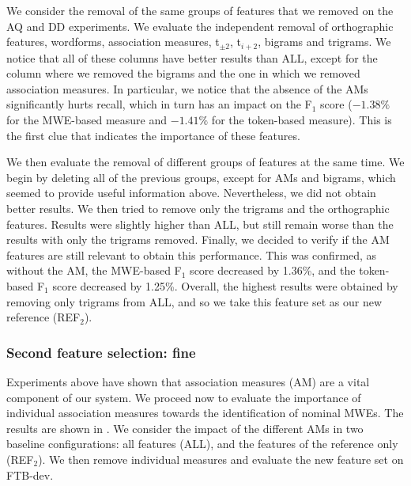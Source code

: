 \documentclass[output=paper,
modfonts
]{langscibook}
\begin{document}
We consider the removal of the same groups of features that we removed on the AQ and DD experiments. We evaluate the independent removal of orthographic features, wordforms, association measures, t$_{\pm 2}$, t$_{i+2}$, bigrams and trigrams. We notice that all of these columns have better results than ALL, except for the column where we removed the bigrams and the one in which we removed association measures. In particular, we notice that the absence of the AMs significantly hurts recall, which in turn has an impact on the F$_1$ score ($-1.38\%$ for the MWE-based measure and $-1.41\%$ for the token-based measure). This is the first clue that indicates the importance of these features. 

We then evaluate the removal of different groups of features at the same time. We begin by deleting all of the previous groups, except for AMs and bigrams, which seemed to provide useful information above. Nevertheless, we did not obtain better results.
We then tried to remove only the trigrams and the orthographic features. Results were slightly higher than ALL, but still remain worse than the results with only the trigrams removed. Finally, we decided to verify if the AM features are still relevant to obtain this performance. This was confirmed, as without the AM, the MWE-based F$_1$ score decreased by 1.36\%, and the token-based F$_1$ score decreased by 1.25\%. 
Overall, the highest results were obtained by removing only trigrams from ALL, and so we take this feature set as our new reference (REF$_2$).  %



\subsubsection{Second feature selection: fine}
\label{schol:sec:results-nominal-feat-fine}
Experiments above have shown that association measures (AM) are a vital component of our system.
We proceed now to evaluate the importance of individual association measures towards the identification of nominal MWEs. The results are shown in .
%
We consider the impact of the different AMs in two baseline configurations: all features (ALL), and the features of the reference only (REF$_2$). We then remove individual measures and evaluate the new feature set on FTB-dev.


\end{document}
